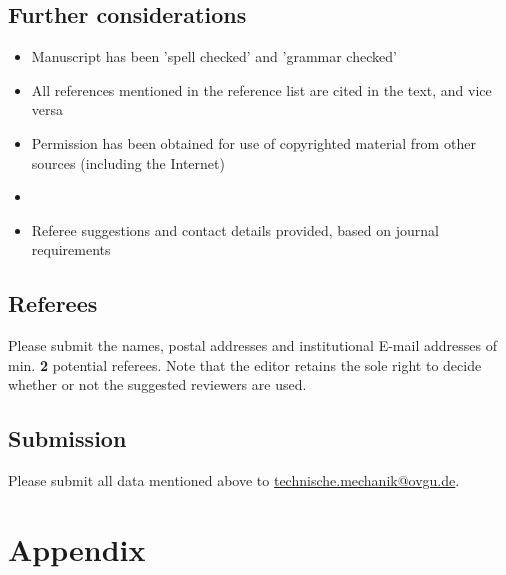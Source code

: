 \documentclass{techmech}
\begin{document}
\subsection{Further considerations}
\begin{itemize}
\item Manuscript has been 'spell checked' and 'grammar checked'
\item All references mentioned in the reference list are cited in the text, and vice versa
\item Permission has been obtained for use of copyrighted material from other sources (including the
Internet)
\item 
\item Referee suggestions and contact details provided, based on journal requirements
\end{itemize}
\subsection{Referees}
Please submit the names, postal addresses and institutional E-mail addresses of min. \textbf{2} potential referees. Note that the editor retains the sole right to decide whether or not the
suggested reviewers are used.

\subsection{Submission}
Please submit all data mentioned above to \href{mailto:technische.mechanik@ovgu.de
}{technische.mechanik@ovgu.de}.

\tmappendix %
\section*{Appendix}
\end{document}
